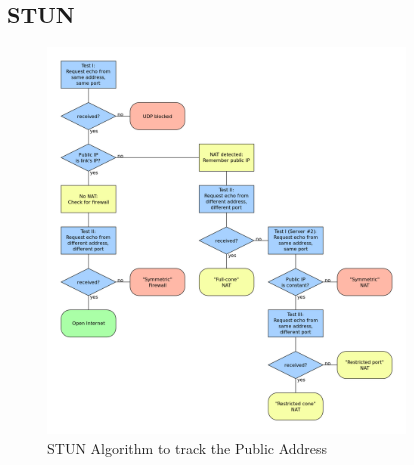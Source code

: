 \subsection{STUN}

\begin{figure}[htbp]
	\centering
		\includegraphics[width=9.5cm]{Figures/STUN_Algorithm.png}
	\caption[STUN Algorithm to track the Public Address]{STUN Algorithm to track the Public Address}
	\label{fig:stunalgorithm}
\end{figure}
